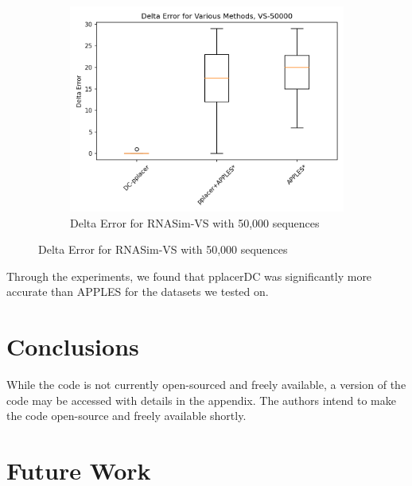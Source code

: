 \documentclass[10pt]{article}
\begin{document}
\begin{figure}[!htb]
\begin{subfigure}{0.5\textwidth}
\includegraphics[width=\textwidth]{Figs/VS-delta-error-50000.png}
\caption{Delta Error for RNASim-VS with 50,000 sequences}
\label{fig:error50000}
\end{subfigure}
\end{figure}




Through the experiments, we found that pplacerDC was significantly more accurate than APPLES for the datasets we tested on.


\section{Conclusions}

While the code is not currently open-sourced and freely available, a version of the code
may be accessed with details in the appendix.
The authors intend to make the code open-source and freely available shortly.

\section{Future Work}
\end{document}
